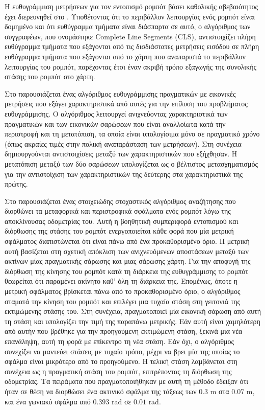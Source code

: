 Η ευθυγράμμιση μετρήσεων για τον εντοπισμό ρομπότ βάσει καθολικής αβεβαιότητος
έχει διερευνηθεί στο \cite{XuZezhong}. Υποθέτοντας ότι το περιβάλλον
λειτουργίας ενός ρομπότ είναι δομημένο και ότι ευθύγραμμα τμήματα είναι
διάσπαρτα σε αυτό, ο αλγόριθμος των συγγραφέων, που ονομάστηκε Complete Line
Segments (CLS), αντιστοιχίζει πλήρη ευθύγραμμα τμήματα που εξάγονται από τις
δισδιάστατες μετρήσεις εισόδου σε πλήρη ευθύγραμμα τμήματα που εξάγονται από το
χάρτη που αναπαριστά το περιβάλλον λειτουργίας του ρομπότ, παρέχοντας έτσι έναν
ακριβή τρόπο εξαγωγής της συνολικής στάσης του ρομπότ στο χάρτη.

Στο \cite{Lingemann2005a} παρουσιάζεται ένας αλγόριθμος ευθυγράμμισης
πραγματικών με εικονικές μετρήσεις που εξάγει χαρακτηριστικά από αυτές για την
επίλυση του προβλήματος ευθυγράμμισης.  Ο αλγόριθμος λειτουργεί ανιχνεύοντας
χαρακτηριστικά των πραγματικών και των εικονικών σαρώσεων που είναι αναλλοίωτα
κατά την περιστροφή και τη μετατόπιση, τα οποία είναι υπολογίσιμα μόνο σε
πραγματικό χρόνο (όπως ακραίες τιμές στην πολική αναπαράσταση των μετρήσεων).
Στη συνέχεια δημιουργούνται αντιστοιχίσεις μεταξύ των χαρακτηριστικών που
εξήχθησαν. Η μετατόπιση μεταξύ των δύο σαρώσεων υπολογίζεται ως ο βέλτιστος
μετασχηματισμός για την αντιστοίχιση των χαρακτηριστικών της δεύτερης στα
χαρακτηριστικά της πρώτης.

Στο \cite{Sandberg2009a} παρουσιάζεται ένας στοιχειώδης στοχαστικός αλγόριθμος
αναζήτησης που διορθώνει τα μεταφορικά και περιστροφικά σφάλματα ενός ρομπότ
λόγω της αποκλίνουσας οδομετρίας του. Αυτή η βοηθητική συμπεριφορά εντοπισμού
και διόρθωσης της στάσης του ρομπότ ενεργοποιείται κάθε φορά που μία μετρική
σφάλματος διαπιστώνεται ότι είναι πάνω από ένα προκαθορισμένο όριο. Η μετρική
αυτή βασίζεται στη σχετική απόκλιση των ανιχνευόμενων αποστάσεων μεταξύ των
ακτίνων μίας πραγματικής σάρωσης και μιας σάρωσης χάρτη. Για την αποφυγή της
διόρθωση της κίνησης του ρομπότ κατά τη διάρκεια της ευθυγράμμισης το ρομπότ
θεωρείται ότι παραμένει ακίνητο καθ' όλη τη διάρκεια της. Επομένως, όποτε η
μετρική σφάλματος βρίσκεται πάνω από το προκαθορισμένο όριο, ο αλγόριθμος
σταματά την κίνηση του ρομπότ και επιλέγει μια τυχαία στάση στη γειτονιά της
εκτιμώμενης στάσης του. Στη συνέχεια, πραγματοποιεί μία εικονική σάρωση από
αυτή τη στάση και υπολογίζει την τιμή της παραπάνω μετρικής. Εάν αυτή είναι
χαμηλότερη από αυτήν που βρέθηκε για την προηγούμενη εκτιμώμενη στάση, ξεκινά
μια νέα επανάληψη, αυτή τη φορά με επίκεντρο τη νέα στάση. Εάν όχι, ο
αλγόριθμος συνεχίζει να μαντεύει στάσεις με τυχαίο τρόπο, μέχρι να βρει μία της
οποίας το σφάλμα είναι μικρότερο από το προηγούμενο. Η τελική στάση
λαμβάνεται στη συνέχεια ως η πραγματική στάση του ρομπότ, επιτρέποντας τη
διόρθωση της οδομετρίας. Τα πειράματα που πραγματοποιήθηκαν με αυτή τη μέθοδο
έδειξαν ότι ήταν σε θέση να διορθώσει ένα ακτινικό σφάλμα της τάξεως των
$0.3$ m στα $0.07$ m, και ένα γωνιακό σφάλμα από $0.393$ rad σε $0.01$ rad.

